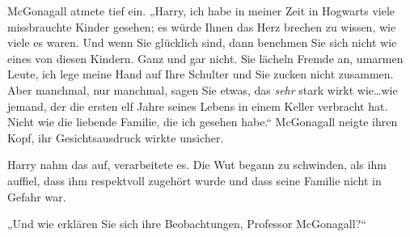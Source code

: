 McGonagall atmete tief ein. „Harry, ich habe in meiner Zeit in Hogwarts viele missbrauchte Kinder gesehen; es würde Ihnen das Herz brechen zu wissen, wie viele es waren. Und wenn Sie glücklich sind, dann benehmen Sie sich nicht wie eines von diesen Kindern. Ganz und gar nicht. Sie lächeln Fremde an, umarmen Leute, ich lege meine Hand auf Ihre Schulter und Sie zucken nicht zusammen. Aber manchmal, nur manchmal, sagen Sie etwas, das \emph{sehr} stark wirkt wie…wie jemand, der die ersten elf Jahre seines Lebens in einem Keller verbracht hat. Nicht wie die liebende Familie, die ich gesehen habe.“ McGonagall neigte ihren Kopf, ihr Gesichtsausdruck wirkte unsicher.

Harry nahm das auf, verarbeitete es. Die Wut begann zu schwinden, als ihm auffiel, dass ihm respektvoll zugehört wurde und dass seine Familie nicht in Gefahr war.

„Und wie erklären Sie sich ihre Beobachtungen, Professor McGonagall?“

